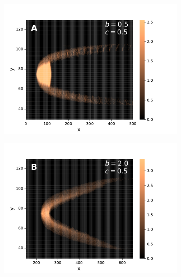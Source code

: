 \documentclass[11pt,twocolumn,twoside]{opticajnl}
\begin{document}
\begin{figure}[t]
\centering
     \begin{subfigure}[b]{0.3\linewidth}
        \raggedleft
        \includegraphics[width=1.1\textwidth]{Figuras/A.pdf}
         \label{fig:A}
     \end{subfigure}
     \begin{subfigure}[b]{0.3\linewidth}
        \centering
         \includegraphics[width=1.1\textwidth]{Figuras/B.pdf}
         \label{fig:B}
     \end{subfigure}
    \begin{subfigure}[b]{0.3\linewidth}
        \raggedright

\end{subfigure}
\end{figure}
\end{document}
